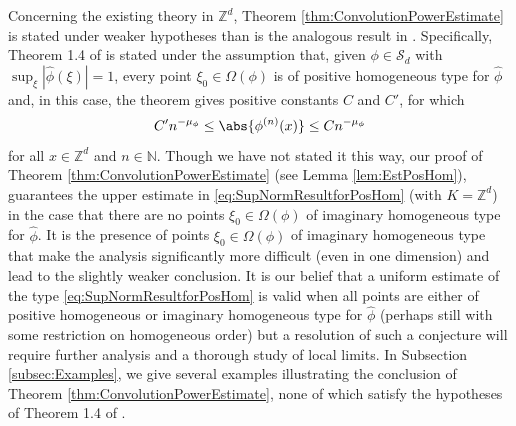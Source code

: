 \documentclass[11pt, letter]{book}
\begin{document}
\noindent Concerning the existing theory in $\mathbb{Z}^d$, Theorem \ref{thm:ConvolutionPowerEstimate} is stated under weaker hypotheses than is the analogous result in \cite{randles_convolution_2017}. Specifically, Theorem 1.4 of \cite{randles_convolution_2017} is stated under the assumption that, given $\phi\in\mathcal{S}_d$ with $\sup_{\xi}|\widehat{\phi}(\xi)|=1$, every point $\xi_0\in\Omega(\phi)$ is of positive homogeneous type for $\widehat{\phi}$ and, in this case, the theorem gives positive constants $C$ and $C'$, for which
\begin{equation}\label{eq:SupNormResultforPosHom}
    C'n^{-\mu_\phi}\leq \abs{\phi^{(n)}(x)}\leq C n^{-\mu_\phi}
\end{equation}
for all $x\in\mathbb{Z}^d$ and $n\in\mathbb{N}$. Though we have not stated it this way, our proof of Theorem \ref{thm:ConvolutionPowerEstimate} (see Lemma \ref{lem:EstPosHom}), guarantees the upper estimate in \eqref{eq:SupNormResultforPosHom} (with $K=\mathbb{Z}^d$) in the case that there are no points $\xi_0\in\Omega(\phi)$ of imaginary homogeneous type for $\widehat{\phi}$. It is the presence of points $\xi_0\in\Omega(\phi)$ of imaginary homogeneous type that make the analysis significantly more difficult (even in one dimension) and lead to the slightly weaker conclusion. It is our belief that a uniform estimate of the type \eqref{eq:SupNormResultforPosHom} is valid when all points are either of positive homogeneous or imaginary homogeneous type for $\widehat\phi$ (perhaps still with some restriction on homogeneous order) but a resolution of such a conjecture will require further analysis and a thorough study of local limits. In Subsection \ref{subsec:Examples}, we give several examples illustrating the conclusion of Theorem \ref{thm:ConvolutionPowerEstimate}, none of which satisfy the hypotheses of Theorem 1.4 of \cite{randles_convolution_2017}.\\
\end{document}
